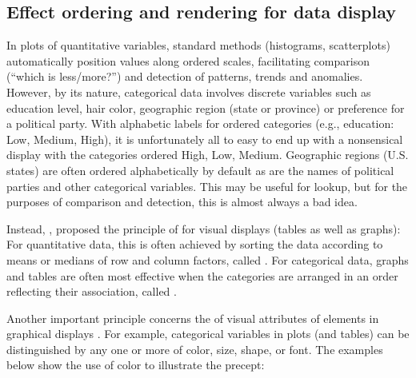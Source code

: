 \documentclass[11pt]{book}
\begin{document}

\subsection{Effect ordering and rendering for data display}\label{sec:effect-order}

In plots of quantitative variables, standard methods
(histograms, scatterplots) automatically position values along
ordered scales, facilitating comparison (``which is less/more?'')
and detection of patterns, trends and anomalies.
However, by its nature, categorical data involves discrete variables such as
education level, hair color, geographic region (state or province)
or preference for a political party.
With alphabetic labels for ordered
categories (e.g., education: Low, Medium, High), it is unfortunately all to
easy to end up with a nonsensical display with the categories
ordered High, Low, Medium.  Geographic regions (U.S. states) are often
ordered alphabetically by default as are the names of political parties
and other categorical variables.  This may be useful for lookup, but
for the purposes of comparison
and detection, this is almost always a bad idea.

Instead, \citet{FriendlyKwan:02:effect}, proposed the principle of
 for visual displays (tables as well as graphs):
For quantitative data, this is often achieved by sorting the
data according to means or medians of row and column factors,
called .
For categorical data, graphs and tables are often most effective
when the categories are arranged in an order reflecting their
association, called .

Another important principle concerns the
 of visual attributes of
elements in graphical displays
\citep{Friendly:02:corrgram}.  For example, categorical variables in plots (and tables)
can be distinguished by any one or more of color, size, shape, or font.
The examples below show the use of color to illustrate the precept:
\end{document}
